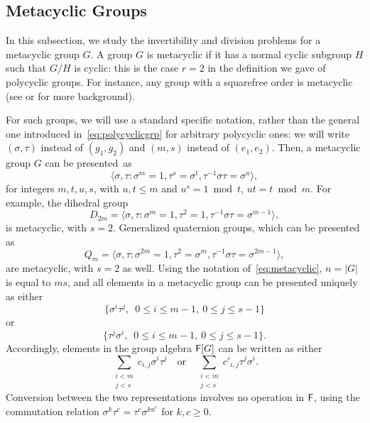 
\subsection{Metacyclic Groups}

In this subsection, we study the invertibility and division problems
for a metacyclic group $G$. A group $G$ is metacyclic if it has a
normal cyclic subgroup $H$ such that $G/H$ is cyclic: this is the case
$r=2$ in the definition we gave of polycyclic groups. For instance,
any group with a squarefree order is metacyclic (see
\citep[p.~88]{Johnson} or \citep[p.~334]{Curtis} for more
background). 

For such groups, we will use a standard specific notation, rather than
the general one introduced in~\eqref{eq:polycyclicgrp} for arbitrary
polycyclic ones: we will write $(\sigma,\tau)$ instead of $(g_1,g_2)$
and $(m,s)$ instead of $(e_1,e_2)$. Then, a metacyclic group $G$ can
be presented~as
\begin{equation}
  \label{eq:metacyclic}
  \langle \sigma,\tau: \sigma^m = 1,  \tau^s = \sigma^t, \tau^{-1}\sigma \tau = \sigma^u \rangle,
\end{equation}
for integers $m,t,u,s$, with $u,t \leq m$ and $u^s = 1 \bmod t$, $ut =
t \bmod m$. For example, the dihedral group
$$D_{2m} = \langle \sigma,\tau: \sigma^m =1, \tau^2 = 1, \tau^{-1}
\sigma \tau = \sigma^{m-1} \rangle, $$ is metacyclic, with
$s=2$. Generalized quaternion groups, which can be presented as
$$Q_m = \langle \sigma,\tau: \sigma^{2m} =1, \tau^2 = \sigma^m,
\tau^{-1} \sigma \tau = \sigma^{2m-1} \rangle,$$ are metacyclic, with
$s=2$ as well. Using the notation of~\eqref{eq:metacyclic}, $n=|G|$ is
equal to $ms$, and all elements in a metacyclic group can be presented
uniquely as either
\begin{equation}\label{pres1}
\{\sigma^i \tau^j,\,\,\, 0\leq i \leq m-1,\ 0\leq j \leq s-1\}  
\end{equation}
or
\begin{equation}\label{pres2}
\{ \tau^j\sigma^i,\,\,\, 0\leq i \leq m-1,\ 0\leq j \leq s-1\}.
\end{equation}
Accordingly, elements in the group algebra ${\mathsf{F}}[G]$ can be written as 
either 
$$\sum_{\substack{i <m\\ j< s}} c_{i,j} \sigma^i \tau^j
\quad\text{or}\quad \sum_{\substack{i <m\\ j< s}} c'_{i,j} \tau^j
\sigma^i.$$ Conversion between the two representations involves no
operation in ${\mathsf{F}}$, using the commutation relation $\sigma^k \tau^c =
\tau^c \sigma^{ku^c}$ for $k,c \ge 0$.

